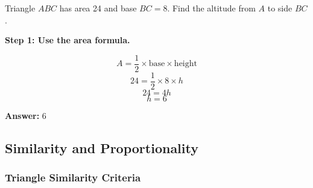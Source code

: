 ﻿\documentclass[12pt]{extarticle}
\begin{document}
Triangle $ABC$ has area 24 and base $BC = 8$. Find the altitude from $A$ to side $BC$.

\begin{solutionbox}
\textbf{Step 1: Use the area formula.}

\[A = \frac{1}{2} \times \text{base} \times \text{height}\]
\[24 = \frac{1}{2} \times 8 \times h\]
\[24 = 4h\]
\[h = 6\]

\textbf{Answer:} $\boxed{6}$
\end{solutionbox}

\subsection{Similarity and Proportionality}

\subsubsection{Triangle Similarity Criteria}
\end{document}

